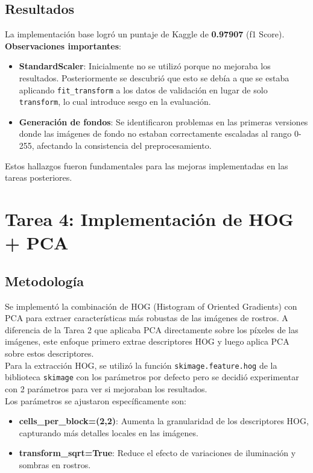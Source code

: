 \documentclass{article}
\begin{document}
\subsection*{Resultados}

La implementación base logró un puntaje de Kaggle de \textbf{0.97907} (f1 Score).\\

\textbf{Observaciones importantes}:
\begin{itemize}
    \item \textbf{StandardScaler}: Inicialmente no se utilizó porque no mejoraba los resultados. Posteriormente se descubrió que esto se debía a que se estaba aplicando \texttt{fit\_transform} a los datos de validación en lugar de solo \texttt{transform}, lo cual introduce sesgo en la evaluación.
    \item \textbf{Generación de fondos}: Se identificaron problemas en las primeras versiones donde las imágenes de fondo no estaban correctamente escaladas al rango 0-255, afectando la consistencia del preprocesamiento.
\end{itemize}

Estos hallazgos fueron fundamentales para las mejoras implementadas en las tareas posteriores.

\pagebreak

\section*{Tarea 4: Implementación de HOG + PCA}

\subsection*{Metodología}

Se implementó la combinación de HOG (Histogram of Oriented Gradients) con PCA para extraer características más robustas de las imágenes de rostros. A diferencia de la Tarea 2 que aplicaba PCA directamente sobre los píxeles de las imágenes, este enfoque primero extrae descriptores HOG y luego aplica PCA sobre estos descriptores.\\

Para la extracción HOG, se utilizó la función \texttt{skimage.feature.hog} de la biblioteca \texttt{skimage} con los parámetros por defecto pero se decidió experimentar con 2 parámetros para ver si mejoraban los resultados.\\

Los parámetros se ajustaron específicamente son:
\begin{itemize}
    \item \textbf{cells\_per\_block=(2,2)}: Aumenta la granularidad de los descriptores HOG, capturando más detalles locales en las imágenes.
    \item \textbf{transform\_sqrt=True}: Reduce el efecto de variaciones de iluminación y sombras en rostros.
\end{itemize}
\end{document}
